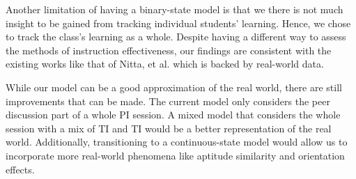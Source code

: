 \documentclass[twocolumn,secnumarabic,amssymb, nobibnotes, aps, prd]{revtex4-2}
\begin{document}
    Another limitation of having a binary-state model is that we there is not much insight to be gained from tracking individual students' learning.
    Hence, we chose to track the class's learning as a whole.
    Despite having a different way to assess the methods of instruction effectiveness, our findings are consistent with the existing works like that of Nitta, et al. \cite{nitta2019mathematical} which is backed by real-world data.

    While our model can be a good approximation of the real world, there are still improvements that can be made.
    The current model only considers the peer discussion part of a whole PI session.
    A mixed model that considers the whole session with a mix of TI and TI would be a better representation of the real world.
    Additionally, transitioning to a continuous-state model would allow us to incorporate more real-world phenomena like aptitude similarity and orientation effects.



\end{document}

